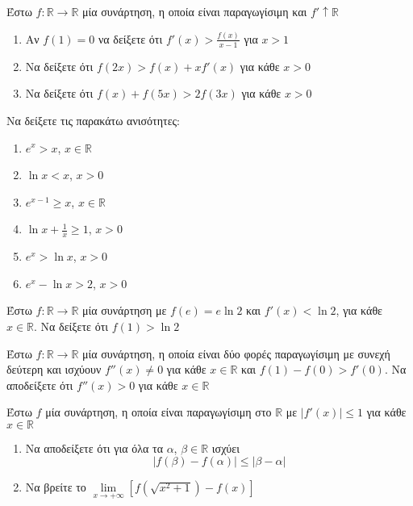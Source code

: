 \documentclass{presentation}
\begin{document}
\begin{askisi}
    Έστω $f:\mathbb{R}\to\mathbb{R}$ μία συνάρτηση, η οποία είναι παραγωγίσιμη και $f'\uparrow \mathbb{R}$
    \begin{enumerate}
        \item<1-> Αν $f(1)=0$ να δείξετε ότι $f'(x)>\frac{f(x)}{x-1}$ για $x>1$
        \item<2-> Να δείξετε ότι $f(2x)>f(x)+xf'(x)$ για κάθε $x>0$
        \item<3-> Να δείξετε ότι $f(x)+f(5x)>2f(3x)$ για κάθε $x>0$
    \end{enumerate}

\end{askisi}

\begin{askisi}
    Να δείξετε τις παρακάτω ανισότητες:
    \begin{enumerate}
        \item<1-> $e^x> x$, $x\in\mathbb{R}$
        \item<2-> $\ln x<x$, $x>0$
        \item<3-> $e^{x-1}\ge x$, $x\in\mathbb{R}$
        \item<4-> $\ln x+\frac{1}{x}\ge 1$, $x>0$
        \item<5-> $e^x>\ln x$, $x>0$
        \item<6-> $e^x-\ln x>2$, $x>0$
    \end{enumerate}

\end{askisi}

\begin{askisi}
    Έστω $f:\mathbb{R}\to\mathbb{R}$ μία συνάρτηση με $f(e)=e\ln 2$ και $f'(x)<\ln 2$, για κάθε $x\in \mathbb{R}$. Να δείξετε ότι $f(1)>\ln 2$

\end{askisi}

\begin{askisi}
    Έστω $f:\mathbb{R}\to\mathbb{R}$ μία συνάρτηση, η οποία είναι δύο φορές παραγωγίσιμη με συνεχή δεύτερη και ισχύουν $f''(x)\ne 0$ για κάθε $x\in\mathbb{R}$ και $f(1)-f(0)>f'(0)$. Να αποδείξετε ότι $f''(x)>0$ για κάθε $x\in\mathbb{R}$

\end{askisi}

\begin{askisi}
    Έστω $f$ μία συνάρτηση, η οποία είναι παραγωγίσιμη στο $\mathbb{R}$ με $|f'(x)|\le 1$ για κάθε $x\in\mathbb{R}$
    \begin{enumerate}
        \item<1-> Να αποδείξετε ότι για όλα τα $α$, $β\in\mathbb{R}$ ισχύει
            $$|f(β)-f(α)|\le |β-α|$$
        \item<2-> Να βρείτε το $\lim\limits_{x \to +\infty}{ \left[  f\left( \sqrt{x^2+1} \right)-f(x)  \right]}$
    \end{enumerate}
\end{askisi}
\end{document}
